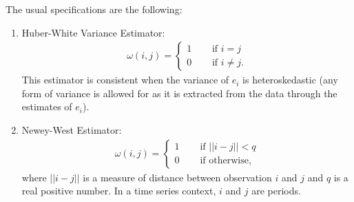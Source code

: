 \noindent The usual specifications are the following:
\begin{enumerate}
	\item Huber-White Variance Estimator:
		\begin{align}
			\omega \left( i, j \right) = \left\{
        \begin{array}{ll}
            1 & \quad \text{ if } i = j \\
            0 & \quad \text{ if } i \neq j.
        \end{array}
    		\right.
		\end{align}
\noindent This estimator is consistent when the variance of $e_i$ is heteroskedastic (any form of variance is allowed for as it is extracted from the data through the estimates of $e_i$). 

\item Newey-West Estimator:
		\begin{align}
			\omega \left( i, j \right) = \left\{
        \begin{array}{ll}
            1 & \quad \text{ if } || i - j || < q\\
            0 & \quad \text{ if otherwise,} 
        \end{array}
    		\right.
		\end{align}
\noindent where $|| i - j ||$ is a measure of distance between observation $i$ and $j$ and $q$ is a real positive number. In a time series context, $i$ and $j$ are periods. 


\end{enumerate}
